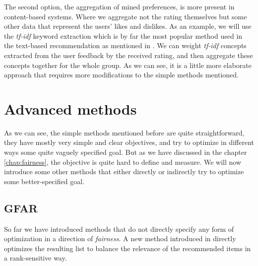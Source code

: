 The second option, the aggregation of mined preferences, is more present in content-based systems. Where we aggregate not the rating themselves but some other data that represent the users' likes and dislikes. As an example, we will use the \textit{tf-idf} keyword extraction which is by far the most popular method used in the text-based recommendation as mentioned in \cite{beel_2016_rs_literature_survey}. We can weight \textit{tf-idf} concepts extracted from the user feedback by the received rating, and then aggregate these concepts together for the whole group. As we can see, it is a little more elaborate approach that requires more modifications to the simple methods mentioned.


\section{Advanced methods}\label{sec:03_advanced_methods}
As we can see, the simple methods mentioned before are quite straightforward, they have mostly very simple and clear objectives, and try to optimize in different ways some quite vaguely specified goal. But as we have discussed in the chapter \ref{chap:fairness}, the objective is quite hard to define and measure. We will now introduce some other methods that either directly or indirectly try to optimize some better-specified goal.

\subsection{GFAR} \label{subsec:03_advanced_methods.gfar}
So far we have introduced methods that do not directly specify any form of optimization in a direction of \textit{fairness}. A new method introduced in\cite{GFAR-kaya2020} directly optimizes the resulting list to balance the relevance of the recommended items in a rank-sensitive way.

